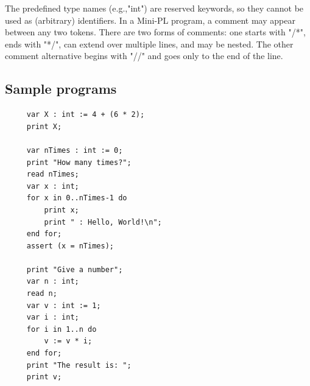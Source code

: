 \documentclass{article}
\begin{document}
The predefined type names (e.g.,"int") are reserved keywords, so they cannot be
used as (arbitrary) identifiers. In a Mini-PL program, a comment may appear
between any two tokens. There are two forms of comments: one starts with "/*",
ends with "*/", can extend over multiple lines, and may be nested. The other
comment alternative begins with "//" and goes only to the end of the line.

\subsection{Sample programs}
\begin{verbatim}
     var X : int := 4 + (6 * 2);
     print X;

     var nTimes : int := 0;
     print "How many times?";
     read nTimes;
     var x : int;
     for x in 0..nTimes-1 do
         print x;
         print " : Hello, World!\n";
     end for;
     assert (x = nTimes);

     print "Give a number";
     var n : int;
     read n;
     var v : int := 1;
     var i : int;
     for i in 1..n do
         v := v * i;
     end for;
     print "The result is: ";
     print v;
\end{verbatim}
\end{document}
